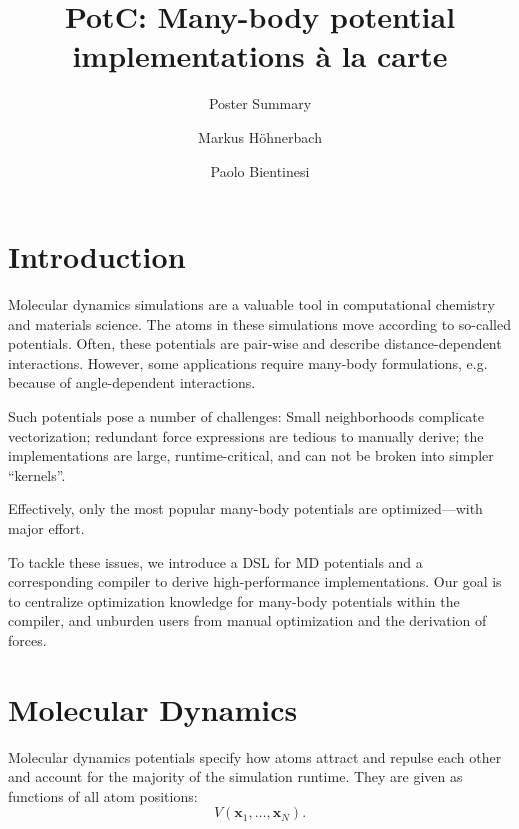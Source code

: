 \documentclass[sigconf]{acmart}
\begin{document}
\title{PotC: Many-body potential implementations \`a la carte}
\subtitle{Poster Summary}

\author{Markus H\"ohnerbach}

\author{Paolo Bientinesi}

\renewcommand{\shortauthors}{M. H\"ohnerbach et al.}

\maketitle

\section{Introduction}

Molecular dynamics simulations are a valuable tool in computational chemistry and materials science.
The atoms in these simulations move according to so-called potentials.
Often, these potentials are pair-wise and describe distance-dependent interactions.
However, some applications require many-body formulations, e.g. because of angle-dependent interactions.

Such potentials pose a number of challenges:
Small neighborhoods complicate vectorization;
redundant force expressions are tedious to manually derive;
the implementations are large, runtime-critical, and can not be broken into simpler ``kernels''.

Effectively, only the most popular many-body potentials are optimized---with major effort.

To tackle these issues, we introduce a DSL for MD potentials and a corresponding compiler to derive high-performance implementations.
Our goal is to centralize optimization knowledge for many-body potentials within the compiler, and unburden users from manual optimization and the derivation of forces.

\section{Molecular Dynamics}

Molecular dynamics potentials specify how atoms attract and repulse each other and account for the majority of the simulation runtime.
They are given as functions of all atom positions:
$$V(\mathbf{x}_1, \dots, \mathbf{x}_N).$$
\end{document}
